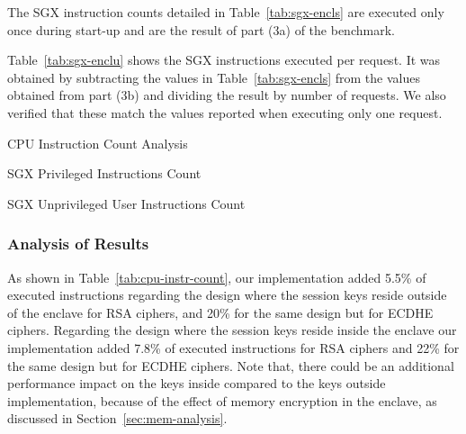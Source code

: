 \documentclass[../../../main.tex]{subfiles}
\begin{document}
The SGX instruction counts detailed in Table~\ref{tab:sgx-encls} are executed
only once during start-up and are the result of part (3a) of the benchmark.

Table~\ref{tab:sgx-enclu} shows the SGX instructions executed per request. It
was obtained by subtracting the values in Table~\ref{tab:sgx-encls} from the
values obtained from part (3b) and dividing the result by number of requests.
We also verified that these match the values reported when executing only one
request.

\begin{table}[H]
  \caption{CPU Instruction Count Analysis}
  \label{tab:cpu-instr-count}
\end{table}

\begin{table}[H]
  \center
  \footnotesize
  \caption{SGX Privileged Instructions Count}
  \label{tab:sgx-encls}
\end{table}

\begin{table}[H]
  \caption{SGX Unprivileged User Instructions Count}
  \label{tab:sgx-enclu}
\end{table}

\subsubsection*{Analysis of Results}
As shown in Table~\ref{tab:cpu-instr-count}, our implementation added 5.5\% of
executed instructions regarding the design where the session keys reside
outside of the enclave for RSA ciphers, and 20\% for the same design but for
ECDHE ciphers. Regarding the design where the session keys reside inside the
enclave our implementation added 7.8\% of executed instructions for RSA ciphers
and 22\% for the same design but for ECDHE ciphers. Note that, there could be
an additional performance impact on the keys inside compared to the keys
outside implementation, because of the effect of memory encryption in the
enclave, as discussed in Section~\ref{sec:mem-analysis}.

\end{document}
